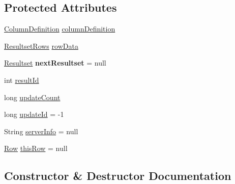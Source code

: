 \subsection*{Protected Attributes}
\begin{DoxyCompactItemize}
\item 
\mbox{\hyperlink{interfacecom_1_1mysql_1_1cj_1_1protocol_1_1_column_definition}{Column\+Definition}} \mbox{\hyperlink{classcom_1_1mysql_1_1cj_1_1protocol_1_1a_1_1result_1_1_native_resultset_a6808a3b33841e898b8d867ee6c54a726}{column\+Definition}}
\item 
\mbox{\hyperlink{interfacecom_1_1mysql_1_1cj_1_1protocol_1_1_resultset_rows}{Resultset\+Rows}} \mbox{\hyperlink{classcom_1_1mysql_1_1cj_1_1protocol_1_1a_1_1result_1_1_native_resultset_a5b0c226ce371d7e0b0e9cf55f80763eb}{row\+Data}}
\item 
\mbox{\label{classcom_1_1mysql_1_1cj_1_1protocol_1_1a_1_1result_1_1_native_resultset_a60ece486b7010abcf502f602c8a4512f}} 
\mbox{\hyperlink{interfacecom_1_1mysql_1_1cj_1_1protocol_1_1_resultset}{Resultset}} {\bfseries next\+Resultset} = null
\item 
int \mbox{\hyperlink{classcom_1_1mysql_1_1cj_1_1protocol_1_1a_1_1result_1_1_native_resultset_a95af162c8937b7f09116f4845419d4a7}{result\+Id}}
\item 
long \mbox{\hyperlink{classcom_1_1mysql_1_1cj_1_1protocol_1_1a_1_1result_1_1_native_resultset_a5d808c3485d895b2f04b36a41ce52039}{update\+Count}}
\item 
long \mbox{\hyperlink{classcom_1_1mysql_1_1cj_1_1protocol_1_1a_1_1result_1_1_native_resultset_a204681a66f5f3a89ca1279af71ba4c35}{update\+Id}} = -\/1
\item 
String \mbox{\hyperlink{classcom_1_1mysql_1_1cj_1_1protocol_1_1a_1_1result_1_1_native_resultset_a572fa76007076521c09e5782bae3e87c}{server\+Info}} = null
\item 
\mbox{\hyperlink{interfacecom_1_1mysql_1_1cj_1_1result_1_1_row}{Row}} \mbox{\hyperlink{classcom_1_1mysql_1_1cj_1_1protocol_1_1a_1_1result_1_1_native_resultset_add93f641e5d10457ef2598c415342e92}{this\+Row}} = null
\end{DoxyCompactItemize}


\subsection{Constructor \& Destructor Documentation}
\mbox{\label{classcom_1_1mysql_1_1cj_1_1protocol_1_1a_1_1result_1_1_native_resultset_a3d5e1cead6b9cf22857d61765721592b}} 
